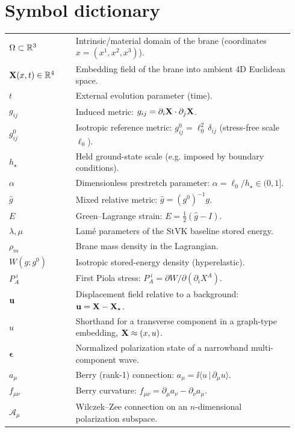 \section{Symbol dictionary}
\label{sec:symbols}

\begin{center}
\begin{tabular}{p{0.22\linewidth} p{0.72\linewidth}}
$\Omega\subset\mathbb{R}^3$ & Intrinsic/material domain of the brane (coordinates $x=(x^1,x^2,x^3)$).\\
$\mathbf{X}(x,t)\in\mathbb{R}^4$ & Embedding field of the brane into ambient 4D Euclidean space.\\
$t$ & External evolution parameter (time).\\
$g_{ij}$ & Induced metric: $g_{ij}=\partial_i\mathbf{X}\cdot\partial_j\mathbf{X}$.\\
$g^0_{ij}$ & Isotropic reference metric: $g^0_{ij}=\ell_0^2\,\delta_{ij}$ (stress-free scale $\ell_0$).\\
$h_\star$ & Held ground-state scale (e.g. imposed by boundary conditions).\\
$\alpha$ & Dimensionless prestretch parameter: $\alpha=\ell_0/h_\star\in(0,1]$.\\
$\widehat g$ & Mixed relative metric: $\widehat g=(g^0)^{-1}g$.\\
$E$ & Green--Lagrange strain: $E=\tfrac12(\widehat g-I)$.\\
$\lambda,\mu$ & Lam\'e parameters of the StVK baseline stored energy.\\
$\rho_m$ & Brane mass density in the Lagrangian.\\
$W(g;g^0)$ & Isotropic stored-energy density (hyperelastic).\\
$P_A^{\;i}$ & First Piola stress: $P_A^{\;i}=\partial W/\partial(\partial_i X^A)$.\\
$\mathbf{u}$ & Displacement field relative to a background: $\mathbf{u}=\mathbf{X}-\mathbf{X}_\star$.\\
$u$ & Shorthand for a transverse component in a graph-type embedding, $\mathbf{X}\approx(x,u)$.\\
$\bm{\epsilon}$ & Normalized polarization state of a narrowband multi-component wave.\\
$a_\mu$ & Berry (rank-1) connection: $a_\mu=\ii\langle u\,|\,\partial_\mu u\rangle$.\\
$f_{\mu\nu}$ & Berry curvature: $f_{\mu\nu}=\partial_\mu a_\nu-\partial_\nu a_\mu$.\\
$\mathcal{A}_\mu$ & Wilczek--Zee connection on an $n$-dimensional polarization subspace.\\

\end{tabular}
\end{center}
